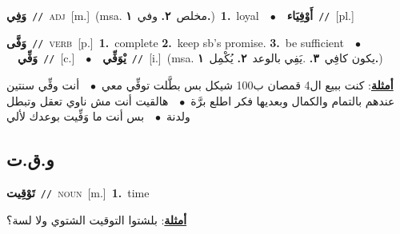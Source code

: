 \documentclass[10pt,a4paper,twoside]{article} %
\begin{document}
\begin{multicols}{2}
{\setlength\topsep{0pt}\textbf{\foreignlanguage{arabic}{وَفِي}}\ {\color{gray}\texttt{//}\color{black}}\ \textsc{adj}\ [m.]\ \color{gray}(msa. \foreignlanguage{arabic}{مخلص}~\foreignlanguage{arabic}{\textbf{٢.}}  \foreignlanguage{arabic}{وفي}~\foreignlanguage{arabic}{\textbf{١.}})\color{black}\ \textbf{1.}~loyal\ \ $\bullet$\ \ \setlength\topsep{0pt}\textbf{\foreignlanguage{arabic}{أَوْفِيَاء}}\ {\color{gray}\texttt{//}\color{black}}\ [pl.]\ } \vspace{2mm}

{\setlength\topsep{0pt}\textbf{\foreignlanguage{arabic}{وَفَّى}}\ {\color{gray}\texttt{//}\color{black}}\ \textsc{verb}\ [p.]\ \textbf{1.}~complete  \textbf{2.}~keep sb's promise.  \textbf{3.}~be sufficient\ \ $\bullet$\ \ \setlength\topsep{0pt}\textbf{\foreignlanguage{arabic}{وَفِّي}}\ {\color{gray}\texttt{//}\color{black}}\ [c.]\ \ $\bullet$\ \ \setlength\topsep{0pt}\textbf{\foreignlanguage{arabic}{يْوَفِّي}}\ {\color{gray}\texttt{//}\color{black}}\ [i.]\ \color{gray}(msa. \foreignlanguage{arabic}{يكون كافِي}~\foreignlanguage{arabic}{\textbf{٣.}}  .\foreignlanguage{arabic}{يَفِي بالوعد}~\foreignlanguage{arabic}{\textbf{٢.}}  \foreignlanguage{arabic}{يُكْمِل}~\foreignlanguage{arabic}{\textbf{١.}})\color{black}\  \begin{flushright}\color{gray}\foreignlanguage{arabic}{\textbf{\underline{\foreignlanguage{arabic}{أمثلة}}}: كنت ببيع ال4 قمصان  ب100 شيكل بس بطَّلت توفِّي معي\ $\bullet$\ \  أنت وفِّي سنتين عندهم بالتمام والكمال وبعديها فكر اطلع برَّة\ $\bullet$\ \  هالقيت أنت مش ناوي تعقل وتبطل ولدنة\ $\bullet$\ \  بس أنت ما وَفِّيت بوعدك لألي}\end{flushright}\color{black}} \vspace{2mm}

\vspace{-3mm}
\subsection*{\color{blue}\foreignlanguage{arabic}{و.ق.ت}\color{blue}{}} 

{\setlength\topsep{0pt}\textbf{\foreignlanguage{arabic}{تَوْقِيت}}\ {\color{gray}\texttt{//}\color{black}}\ \textsc{noun}\ [m.]\ \textbf{1.}~time\  \begin{flushright}\color{gray}\foreignlanguage{arabic}{\textbf{\underline{\foreignlanguage{arabic}{أمثلة}}}: بلشتوا التوقيت الشتوي ولا لسة؟}\end{flushright}\color{black}} \vspace{2mm}


\end{multicols}
\end{document}
